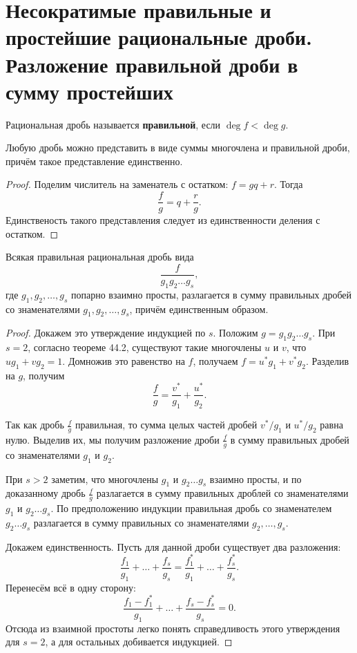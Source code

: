 \section{Несократимые правильные и простейшие рациональные дроби. Разложение правильной дроби в сумму простейших}

\begin{definition}
    Рациональная дробь называется \textbf{правильной}, если $\deg f < \deg g$.
\end{definition}

\begin{statement}
    Любую дробь можно представить в виде суммы многочлена и правильной дроби, причём такое представление единственно.
\end{statement}

\begin{proof}
    Поделим числитель на заменатель с остатком: $f = gq + r$. Тогда
    $$
    \frac{f}{g} = q + \frac{r}{g}.
    $$
    Единственость такого представления следует из единственности деления с остатком.
\end{proof}

\begin{lemma}
    Всякая правильная рациональная дробь вида
    $$
    \frac{f}{g_1g_2\ldots g_s},
    $$
    где $g_1, g_2, \ldots, g_s$ попарно взаимно просты, разлагается в сумму правильных дробей со знаменателями $g_1, g_2, \ldots, g_s$, причём единственным образом.
\end{lemma}

\begin{proof}
    Докажем это утверждение индукцией по $s$. Положим $g = g_1g_2\ldots g_s$. При $s = 2$, согласно теореме 44.2, существуют такие многочлены $u$ и $v$, что $ug_1 + vg_2 = 1$. Домножив это равенство на $f$, получаем $f = u^\ast g_1 + v^\ast g_2$. Разделив на $g$, получим
    $$
    \frac{f}{g} = \frac{v^\ast}{g_1} + \frac{u^\ast}{g_2}.
    $$

    Так как дробь $\displaystyle\frac{f}{g}$ правильная, то сумма целых частей дробей $v^\ast / g_1$ и $u^\ast / g_2$ равна нулю. Выделив их, мы получим разложение дроби $\displaystyle\frac{f}{g}$ в сумму правильных дробей со знаменателями $g_1$ и $g_2$.

    При $s > 2$ заметим, что многочлены $g_1$ и $g_2\ldots g_s$ взаимно просты, и по доказанному дробь $\displaystyle\frac{f}{g}$ разлагается в сумму правильных дроблей со знаменателями $g_1$ и $g_2\ldots g_s$. По предположению индукции правильная дробь со знаменателем $g_2\ldots g_s$ разлагается в сумму правильных со знаменателями $g_2, \ldots, g_s$.

    Докажем единственность. Пусть для данной дроби существует два разложения:
    $$
    \frac{f_1}{g_1} + \ldots + \frac{f_s}{g_s} = \frac{f_1^\ast}{g_1} + \ldots + \frac{f_s^\ast}{g_s}.
    $$
    Перенесём всё в одну сторону:
    $$
    \frac{f_1 - f_1^\ast}{g_1} + \ldots + \frac{f_s - f_s^\ast}{g_s} = 0.
    $$
    Отсюда из взаимной простоты легко понять справедливость этого утверждения для $s = 2$, а для остальных добивается индукцией.
\end{proof}

